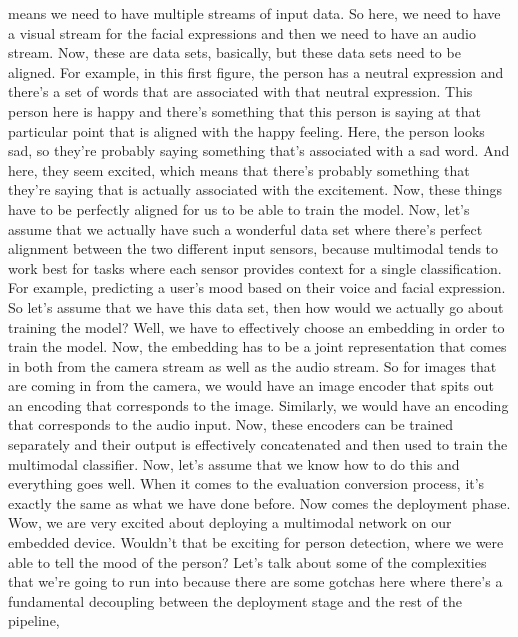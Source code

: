     means we need to have multiple streams of input data.
    So here, we need to have a visual stream for the facial expressions
    and then we need to have an audio stream.
    Now, these are data sets, basically, but these data sets need to be aligned.
    For example, in this first figure, the person has a neutral expression
    and there's a set of words that are associated
    with that neutral expression.
    This person here is happy and there's something
    that this person is saying at that particular point that
    is aligned with the happy feeling.
    Here, the person looks sad, so they're probably saying something
    that's associated with a sad word.
    And here, they seem excited, which means that there's probably something
    that they're saying that is actually associated with the excitement.
    Now, these things have to be perfectly aligned
    for us to be able to train the model.
    Now, let's assume that we actually have such a wonderful data set where there's
    perfect alignment between the two different input sensors,
    because multimodal tends to work best for tasks
    where each sensor provides context for a single classification.
    For example, predicting a user's mood based
    on their voice and facial expression.
    So let's assume that we have this data set,
    then how would we actually go about training the model?
    Well, we have to effectively choose an embedding in order to train the model.
    Now, the embedding has to be a joint representation that
    comes in both from the camera stream as well as the audio stream.
    So for images that are coming in from the camera,
    we would have an image encoder that spits out an encoding that
    corresponds to the image.
    Similarly, we would have an encoding that corresponds to the audio input.
    Now, these encoders can be trained separately
    and their output is effectively concatenated and then
    used to train the multimodal classifier.
    Now, let's assume that we know how to do this and everything goes well.
    When it comes to the evaluation conversion process,
    it's exactly the same as what we have done before.
    Now comes the deployment phase.
    Wow, we are very excited about deploying a multimodal network
    on our embedded device.
    Wouldn't that be exciting for person detection, where we were
    able to tell the mood of the person?
    Let's talk about some of the complexities
    that we're going to run into because there
    are some gotchas here where there's a fundamental decoupling
    between the deployment stage and the rest of the pipeline,
